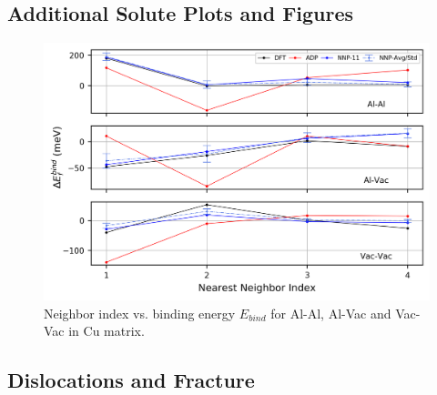 \documentclass{article}
\begin{document}
\subsection{Additional Solute Plots and Figures} \label{apd_sct:adn_solsol}

\begin{figure}[H]%
\centering%
\includegraphics[width=1\textwidth,center]{./figures/solsol_in_cu.png}%
\caption{Neighbor index vs. binding energy $E_{bind}$ for Al-Al, Al-Vac and Vac-Vac in Cu matrix.}%
\label{fig:solsol_in_cu}
\end{figure}


\subsection{Dislocations and Fracture} \label{apd_sct:fracturedislocation_images}
\end{document}
